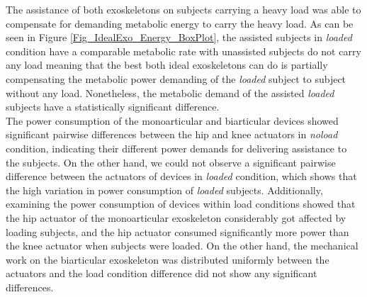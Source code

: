 \documentclass[10pt,letterpaper]{article}
\begin{document}
The assistance of both exoskeletons on subjects carrying a heavy load was able to compensate for demanding metabolic energy to carry the heavy load. As can be seen in Figure \ref{Fig_IdealExo_Energy_BoxPlot}, the assisted subjects in \textit{loaded} condition have a comparable metabolic rate with unassisted subjects do not carry any load meaning that the best both ideal exoskeletons can do is partially compensating the metabolic power demanding of the \textit{loaded} subject to subject without any load. Nonetheless, the metabolic demand of the assisted \textit{loaded} subjects have a statistically significant difference.\\
The power consumption of the monoarticular and biarticular devices showed significant pairwise differences between the hip and knee actuators in {\it noload} condition, indicating their different power demands for delivering assistance to the subjects. On the other hand, we could not observe a significant pairwise difference between the actuators of devices in {\it loaded} condition, which shows that the high variation in power consumption of {\it loaded} subjects.
Additionally, examining the power consumption of devices within load conditions showed that the hip actuator of the monoarticular exoskeleton considerably got affected by loading subjects, and the hip actuator consumed significantly more power than the knee actuator when subjects were loaded. On the other hand, the mechanical work on the biarticular exoskeleton was distributed uniformly between the actuators and the load condition difference did not show any significant differences.\\
\end{document}
